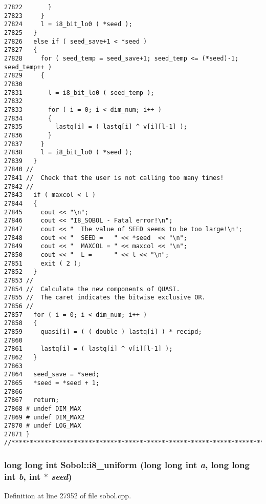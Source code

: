\begin{Code}
\begin{verbatim}
27822       }
27823     }
27824     l = i8_bit_lo0 ( *seed );
27825   }
27826   else if ( seed_save+1 < *seed )
27827   {
27828     for ( seed_temp = seed_save+1; seed_temp <= (*seed)-1; seed_temp++ )
27829     {
27830 
27831       l = i8_bit_lo0 ( seed_temp );
27832 
27833       for ( i = 0; i < dim_num; i++ )
27834       {
27835         lastq[i] = ( lastq[i] ^ v[i][l-1] );
27836       }
27837     }
27838     l = i8_bit_lo0 ( *seed );
27839   }
27840 //
27841 //  Check that the user is not calling too many times!
27842 //
27843   if ( maxcol < l )
27844   {
27845     cout << "\n";
27846     cout << "I8_SOBOL - Fatal error!\n";
27847     cout << "  The value of SEED seems to be too large!\n";
27848     cout << "  SEED =   " << *seed  << "\n";
27849     cout << "  MAXCOL = " << maxcol << "\n";
27850     cout << "  L =      " << l << "\n";
27851     exit ( 2 );
27852   }
27853 //
27854 //  Calculate the new components of QUASI.
27855 //  The caret indicates the bitwise exclusive OR.
27856 //
27857   for ( i = 0; i < dim_num; i++ )
27858   {
27859     quasi[i] = ( ( double ) lastq[i] ) * recipd;
27860 
27861     lastq[i] = ( lastq[i] ^ v[i][l-1] );
27862   }
27863 
27864   seed_save = *seed;
27865   *seed = *seed + 1;
27866 
27867   return;
27868 # undef DIM_MAX
27869 # undef DIM_MAX2
27870 # undef LOG_MAX
27871 }
//****************************************************************************80
\end{verbatim}
\end{Code}


\subsubsection{\setlength{\rightskip}{0pt plus 5cm}long long int Sobol::i8\_\-uniform (long long int {\em a}, long long int {\em b}, int $\ast$ {\em seed})}\label{namespaceSobol_e826404c44f0bc42d848e95c79666ff4}




Definition at line 27952 of file sobol.cpp.

